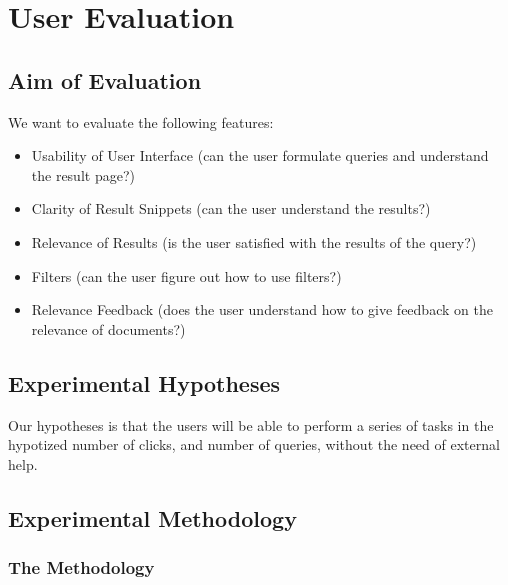 \documentclass[unicode,9pt,a4paper,oneside,numbers=endperiod,openany]{scrartcl}
\begin{document}
\section{User Evaluation}

\subsection{Aim of Evaluation}

We want to evaluate the following features:

\begin{itemize}
    \item Usability of User Interface (can the user formulate queries and understand the result page?)
    \item Clarity of Result Snippets (can the user understand the results?)
    \item Relevance of Results (is the user satisfied with the results of the query?)
    \item Filters (can the user figure out how to use filters?)
    \item Relevance Feedback (does the user understand how to give feedback on the relevance of documents?)
\end{itemize}

\subsection{Experimental Hypotheses}

Our hypotheses is that the users will be able to perform a series of tasks in the hypotized number of clicks, and number of queries, without the need of external help.

\subsection{Experimental Methodology}

\subsubsection{The Methodology}
\end{document}
